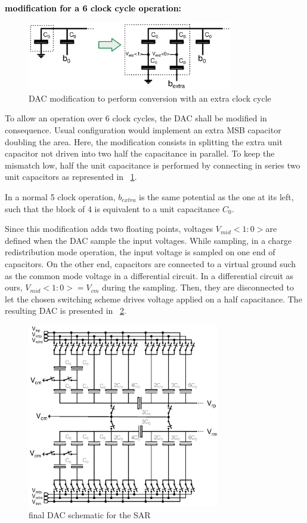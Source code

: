 \textbf{\textcolor{black}{modification for a 6 clock cycle operation:}}
\begin{figure}[htp]
	\centering
	\includegraphics[width=0.8\textwidth]{Chapter4/Figs/sar-extra-clock-cycle.ps}
	\caption{DAC modification to perform conversion with an extra clock cycle}
	\label{fig:sar-dac-extra}
\end{figure}
To allow an operation over 6 clock cycles, the DAC shall be modified in consequence. Usual configuration would implement an extra MSB capacitor doubling the area. Here, the modification consists in splitting the extra unit capacitor not driven into two half the capacitance in parallel. To keep the mismatch low, half the unit capacitance is performed by connecting in series two unit capacitors as represented in \figurename~\ref{fig:sar-dac-extra}.


In a normal 5 clock operation, \(b_{extra}\) is the same potential as the one at its left, such that the block of 4 is equivalent to a unit capacitance \(C_0 \).

Since this modification adds two floating points, voltages \(V_{mid}<1:0> \)are defined when the DAC sample the input voltages. While sampling, in a charge redistribution mode operation, the input voltage is sampled on one end of capacitors. On the other end, capacitors are connected to a virtual ground such as the common mode voltage in a differential circuit. In a differential circuit as ours, \(V_{mid}<1:0> = V_{cm}\) during the sampling. Then, they are disconnected to let the chosen switching scheme drives voltage applied on a half capacitance. The resulting DAC is presented in \figurename~\ref{fig:sar-dac-full}.

\begin{figure}[htp]
	\centering
	\includegraphics[width=0.75\textwidth]{Chapter4/Figs/sar-dac-full.ps}
	\caption{final DAC schematic for the SAR}
	\label{fig:sar-dac-full}
\end{figure}

